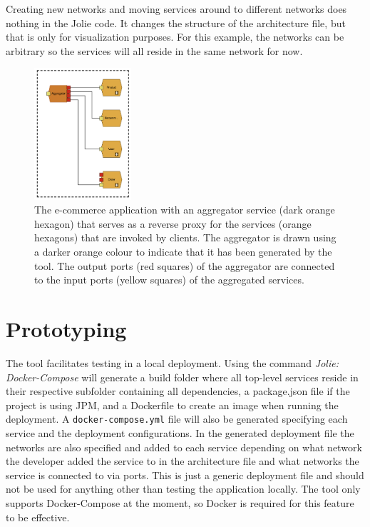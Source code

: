 Creating new networks and moving services around to different networks does nothing in the Jolie code. It changes the structure of the architecture file, but that is only for visualization purposes. 
For this example, the networks can be arbitrary so the services will all reside in the same network for now.

\begin{figure}[t]
    \center
    \includegraphics[width=0.32\textwidth]{figures/jv_aggregator.png}
    \caption{The e-commerce application with an aggregator service (dark orange hexagon) that serves as a reverse proxy for the services (orange hexagons) that are invoked by clients.
    The aggregator is drawn using a darker orange colour to indicate that it has been generated by the tool. The output ports (red squares) of the aggregator are connected to the input ports (yellow squares) of the aggregated services.}
    \label{figure:jv_aggregate}
\end{figure}

\section{Prototyping}
The tool facilitates testing in a local deployment. Using the command \emph{Jolie: Docker-Compose} will generate a build folder where all top-level services reside in their respective subfolder containing all dependencies, a package.json file if the project is using JPM, and a Dockerfile to create an image when running the deployment.
A \texttt{docker-compose.yml} file will also be generated specifying each service and the deployment configurations.
In the generated deployment file the networks are also specified and added to each service depending on what network the developer added the service to in the architecture file and what networks the service is connected to via ports.
This is just a generic deployment file and should not be used for anything other than testing the application locally.
The tool only supports Docker-Compose at the moment, so Docker is required for this feature to be effective.

